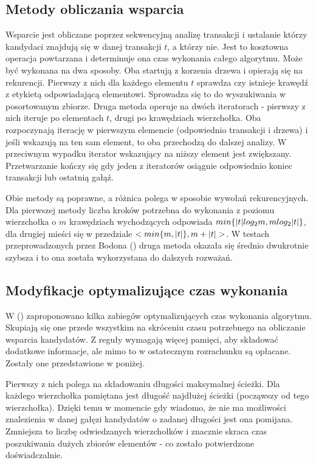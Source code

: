 \subsection*{Metody obliczania wsparcia}
Wsparcie jest obliczane poprzez sekwencyjną analizę transakcji i ustalanie którzy kandydaci znajdują się w danej transakcji \(t\), a którzy nie. Jest to kosztowna operacja powtarzana i determinuje ona czas wykonania całego algorytmu. Może być wykonana na dwa sposoby. Oba startują z korzenia drzewa i opierają się na rekurencji. Pierwszy z nich dla każdego elementu \(t\) sprawdza czy istnieje krawędź z etykietą odpowiadającą elementowi. Sprowadza się to do wyszukiwania w posortowanym zbiorze. Druga metoda operuje na dwóch iteratorach - pierwszy z nich iteruje po elementach \(t\), drugi po krawędziach wierzchołka. Oba rozpoczynają iterację w pierwszym elemencie (odpowiednio transakcji i drzewa) i jeśli wskazują na ten sam element, to oba przechodzą do dalszej analizy. W przeciwnym wypadku iterator wskazujący na niższy element jest zwiększany. Przetwarzanie kończy się gdy jeden z iteratorów osiągnie odpowiednio koniec transakcji lub ostatnią gałąź.

Obie metody są poprawne, a różnica polega w sposobie wywołań rekurencyjnych. Dla pierwszej metody liczba kroków potrzebna do wykonania z poziomu wierzchołka o \(m\) krawędziach wychodzących odpowiada \(min\{|t| log_2{m},\nolinebreak m\nolinebreak log_2{|t|}\}\), dla drugiej mieści się w przedziale \(<min\{m,\nolinebreak|t|\},\nolinebreak m\nolinebreak+\nolinebreak|t|>\). W testach przeprowadzonych przez Bodona (\cite{Bodon}) druga metoda okazała się średnio dwukrotnie szybsza i to ona została wykorzystana do dalszych rozważań.

\subsection*{Modyfikacje optymalizujące czas wykonania}
W (\cite{Bodon}) zaproponowano kilka zabiegów optymalizujących czas wykonania algorytmu. Skupiają się one przede wszystkim na skróceniu czasu potrzebnego na obliczanie wsparcia kandydatów. Z reguły wymagają więcej pamięci, aby składować dodatkowe informacje, ale mimo to w ostatecznym rozrachunku są opłacane. Zostały one przedstawione w poniżej.

Pierwszy z nich polega na składowaniu długości maksymalnej ścieżki. Dla każdego wierzchołka pamiętana jest długość najdłużej ścieżki (począwszy od tego wierzchołka). Dzięki temu w momencie gdy wiadomo, że nie ma możliwości znalezienia w danej gałęzi kandydatów o zadanej długości jest ona pomijana. Zmniejsza to liczbę odwiedzanych wierzchołków i znacznie skraca czas poszukiwania dużych zbiorów elementów - co zostało potwierdzone doświadczalnie.

